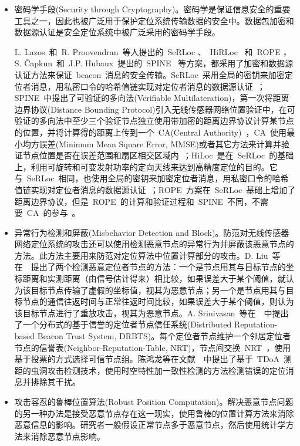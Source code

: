 \documentclass[a4paper,10pt]{article}
\begin{document}
\begin{itemize}

\item 密码学手段(Security through Cryptography)。密码学是保证信息安全的重要工具之一，因此也被广泛用于保护定位系统传输数据的安全中。数据包加密和数据源认证是安全定位系统中被广泛采用的密码学手段。

L. Lazos~和~R. Proovendran~等人提出的~SeRLoc \cite{Lazos2005}、~HiRLoc \cite{Lazos2005a}~和~ROPE \cite{Lazos2006}，S. \v{C}apkun~和~J.P. Hubaux~提出的~SPINE \cite{Capkun2006}~等方案，都采用了加密和数据源认证方法来保证~beacon~消息的安全传输。SeRLoc~采用全局的密钥来加密定位者消息，用私密口令的哈希值链实现对定位者消息的数据源认证~\cite{Lazos2005}；SPINE~中提出了可验证的多向法(Verifiable Multilateration)，第一次将距离边界协议(Distance Bounding Protocol)引入无线传感器网络位置验证中，在可验证的多向法中至少三个验证节点独立使用带加密的距离边界协议计算某节点的位置，并将计算得的距离上传到一个~CA(Central Authority)~，CA~使用最小均方误差(Minimum Mean Square Error, MMSE)或者其它方法来计算并验证节点位置是否在误差范围和扇区相交区域内~\cite{Capkun2006}；HiLoc~是在~SeRLoc~的基础上，利用可旋转和可变发射功率的定向天线来达到高精度定位的目的。它与~SeRLoc~相同，也使用全局的密钥来加密定位者消息，用私密口令的哈希值链实现对定位者消息的数据源认证~\cite{Lazos2005a}；ROPE~方案在~SeRLoc~基础上增加了距离边界协议，但是~ROPE~的计算和验证过程和~SPINE~不同，不需要~CA~的参与~\cite{Lazos2006}。

\item 异常行为检测和屏蔽(Misbehavior Detection and Block)。防范对无线传感器网络定位系统的攻击还可以使用检测恶意节点的异常行为并屏蔽该恶意节点的方法。此方法主要用来防范对定位算法中位置计算部分的攻击。D. Liu~等在~\cite{Liu2005c}~提出了两个检测恶意定位者节点的方法：一个是节点用其与目标节点的坐标距离和实测距离（由信号估计得来）相比较，如果误差大于某个阈值，就认为该目标节点传输了虚假的坐标值，视其为恶意节点；另一个是节点用其与目标节点的通信往返时间与正常往返时间比较，如果误差大于某个阈值，则认为该目标节点进行了重放攻击，视其为恶意节点。A. Srinivasan~等在~\cite{Srinivasan2006}~中提出了一个分布式的基于信誉的定位者节点信任系统(Distributed Reputation-based Beacon Trust System, DRBTS)。每个定位者节点维护一个邻居定位者节点的信誉表(Neighbor-Reputation-Table, NRT)，节点间交换~NRT~，使用基于投票的方式选择可信节点组。陈鸿龙等在文献~\cite{Chen2008}~中提出了基于~TDoA~测距的虫洞攻击检测技术，使用时空特性加一致性检测的方法检测错误的定位消息并排除其干扰。

\item 攻击容忍的鲁棒位置算法(Robust Position Computation)。解决恶意节点问题的另一种办法是接受恶意节点存在这一现实，使用鲁棒的位置计算方法来消除恶意信息的影响。研究者一般假设正常节点多于恶意节点，然后使用统计学方法来消除恶意节点影响。


\end{itemize}
\end{document}
